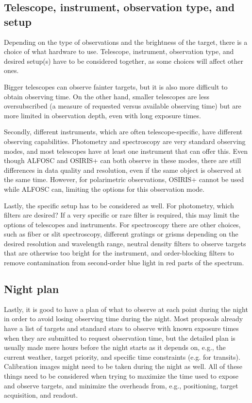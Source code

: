 \documentclass[a4paper,oneside,12pt, class=Latex/Classes/PhDthesisPSnPDF, crop=false]{standalone}
\begin{document}
\subsection{Telescope, instrument, observation type, and setup}
Depending on the type of observations and the brightness of the target, there is a choice of what hardware to use. Telescope, instrument, observation type, and desired setup(s) have to be considered together, as some choices will affect other ones.

Bigger telescopes can observe fainter targets, but it is also more difficult to obtain observing time. On the other hand, smaller telescopes are less oversubscribed (a measure of requested versus available observing time) but are more limited in observation depth, even with long exposure times.

Secondly, different instruments, which are often telescope-specific, have different observing capabilities. Photometry and spectroscopy are very standard observing modes, and most telescopes have at least one instrument that can offer this. Even though ALFOSC and OSIRIS+ can both observe in these modes, there are still differences in data quality and resolution, even if the same object is observed at the same time. However, for polarimetric observations, OSIRIS+ cannot be used while ALFOSC can, limiting the options for this observation mode.

Lastly, the specific setup has to be considered as well. For photometry, which filters are desired? If a very specific or rare filter is required, this may limit the options of telescopes and instruments. For spectroscopy there are other choices, such as fiber or slit spectroscopy, different gratings or grisms depending on the desired resolution and wavelength range, neutral density filters to observe targets that are otherwise too bright for the instrument, and order-blocking filters to remove contamination from second-order blue light in red parts of the spectrum.


\subsection{Night plan}
Lastly, it is good to have a plan of what to observe at each point during the night in order to avoid losing observing time during the night. Most proposals already have a list of targets and standard stars to observe with known exposure times when they are submitted to request observation time, but the detailed plan is usually made mere hours before the night starts as it depends on, e.g., the current weather, target priority, and specific time constraints (e.g. for transits). Calibration images might need to be taken during the night as well. All of these things need to be considered when trying to maximize the time used to expose and observe targets, and minimize the overheads from, e.g., positioning, target acquisition, and readout.
\end{document}
